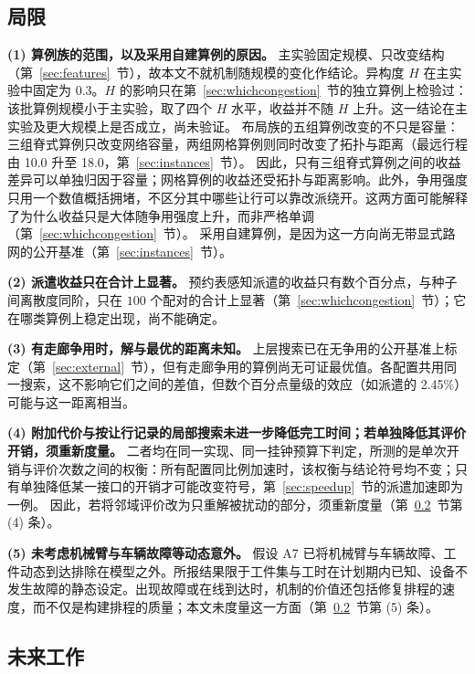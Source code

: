\documentclass[manuscript,screen,review]{acmart}
\newcommand{\NPairs}{100}
\newcommand{\GainProbeLoop}{2.45\%}      %
\newcommand{\LegDumbbell}{10.0}          %
\newcommand{\LegGrid}{18.0}              %
\begin{document}
\subsection{局限}
\label{sec:limitations}

\textbf{(1) 算例族的范围，以及采用自建算例的原因。}
主实验固定规模、只改变结构（第~\ref{sec:features}~节），故本文不就机制随规模的变化作结论。异构度 $H$ 在主实验中固定为 $0.3$。$H$ 的影响只在第~\ref{sec:whichcongestion}~节的独立算例上检验过：该批算例规模小于主实验，取了四个 $H$ 水平，收益并不随 $H$ 上升。这一结论在主实验及更大规模上是否成立，尚未验证。
布局族的五组算例改变的不只是容量：三组脊式算例只改变网络容量，两组网格算例则同时改变了拓扑与距离（最远行程由 \LegDumbbell{} 升至 \LegGrid{}，第~\ref{sec:instances}~节）。
因此，只有三组脊式算例之间的收益差异可以单独归因于容量；网格算例的收益还受拓扑与距离影响。此外，争用强度只用一个数值概括拥堵，不区分其中哪些让行可以靠改派绕开。这两方面可能解释了为什么收益只是大体随争用强度上升，而非严格单调（第~\ref{sec:whichcongestion}~节）。
采用自建算例，是因为这一方向尚无带显式路网的公开基准（第~\ref{sec:instances}~节）。

\textbf{(2) 派遣收益只在合计上显著。}
预约表感知派遣的收益只有数个百分点，与种子间离散度同阶，只在 $\NPairs$ 个配对的合计上显著（第~\ref{sec:whichcongestion}~节）；它在哪类算例上稳定出现，尚不能确定。

\textbf{(3) 有走廊争用时，解与最优的距离未知。}
上层搜索已在无争用的公开基准上标定（第~\ref{sec:external}~节），但有走廊争用的算例尚无可证最优值。各配置共用同一搜索，这不影响它们之间的差值，但数个百分点量级的效应（如派遣的 \GainProbeLoop{}）可能与这一距离相当。

\textbf{(4) 附加代价与按让行记录的局部搜索未进一步降低完工时间；若单独降低其评价开销，须重新度量。}
二者均在同一实现、同一挂钟预算下判定，所测的是单次开销与评价次数之间的权衡：所有配置同比例加速时，该权衡与结论符号均不变；只有单独降低某一接口的开销才可能改变符号，第~\ref{sec:speedup}~节的派遣加速即为一例。
因此，若将邻域评价改为只重解被扰动的部分，须重新度量（第~\ref{sec:future_work}~节第 (4) 条）。

\textbf{(5) 未考虑机械臂与车辆故障等动态意外。}
假设 A7 已将机械臂与车辆故障、工件动态到达排除在模型之外。所报结果限于工件集与工时在计划期内已知、设备不发生故障的静态设定。出现故障或在线到达时，机制的价值还包括修复排程的速度，而不仅是构建排程的质量；本文未度量这一方面（第~\ref{sec:future_work}~节第 (5) 条）。

\subsection{未来工作}
\label{sec:future_work}
\end{document}

